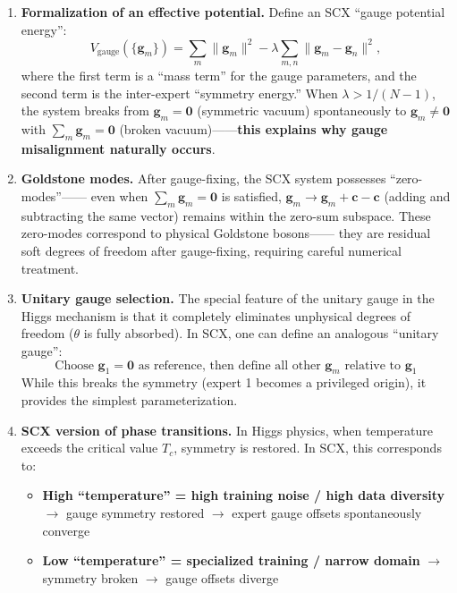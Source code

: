 \documentclass[12pt,a4paper]{article}
\theoremstyle{remark}
\newcommand{\gaugeparam}{\mathbf{g}}
\begin{document}
\begin{enumerate}[label=\textbf{(H\arabic*)}]
    \item \textbf{Formalization of an effective potential.} Define an SCX ``gauge potential energy'':
    \begin{equation}
        V_{\text{gauge}}(\{\gaugeparam_m\}) = \sum_{m} \|\gaugeparam_m\|^2 -
        \lambda \sum_{m,n} \|\gaugeparam_m - \gaugeparam_n\|^2,
    \end{equation}
    where the first term is a ``mass term'' for the gauge parameters, and the second term is the inter-expert ``symmetry energy.''
    When $\lambda > 1/(N-1)$, the system breaks from $\gaugeparam_m = \mathbf{0}$ (symmetric vacuum)
    spontaneously to $\gaugeparam_m \neq \mathbf{0}$ with $\sum_m \gaugeparam_m = \mathbf{0}$
    (broken vacuum)——\textbf{this explains why gauge misalignment naturally occurs}.

    \item \textbf{Goldstone modes.} After gauge-fixing, the SCX system possesses ``zero-modes''——
    even when $\sum_m \gaugeparam_m = \mathbf{0}$ is satisfied,
    $\gaugeparam_m \to \gaugeparam_m + \mathbf{c} - \mathbf{c}$ (adding and subtracting the same vector)
    remains within the zero-sum subspace. These zero-modes correspond to physical Goldstone bosons——
    they are residual soft degrees of freedom after gauge-fixing, requiring careful numerical treatment.

    \item \textbf{Unitary gauge selection.} The special feature of the unitary gauge in the Higgs mechanism is that it completely eliminates
    unphysical degrees of freedom ($\theta$ is fully absorbed). In SCX, one can define an analogous ``unitary gauge'':
    \begin{equation}
        \text{Choose } \gaugeparam_1 = \mathbf{0} \text{ as reference, then define all other } \gaugeparam_m
        \text{ relative to } \gaugeparam_1
    \end{equation}
    While this breaks the symmetry (expert 1 becomes a privileged origin), it provides the simplest parameterization.

    \item \textbf{SCX version of phase transitions.} In Higgs physics, when temperature exceeds the critical value $T_c$,
    symmetry is restored. In SCX, this corresponds to:
    \begin{itemize}
        \item \textbf{High ``temperature'' = high training noise / high data diversity} $\to$ gauge symmetry restored $\to$
        expert gauge offsets spontaneously converge
        \item \textbf{Low ``temperature'' = specialized training / narrow domain} $\to$ symmetry broken $\to$
        gauge offsets diverge
    \end{itemize}
\end{enumerate}
\end{document}
